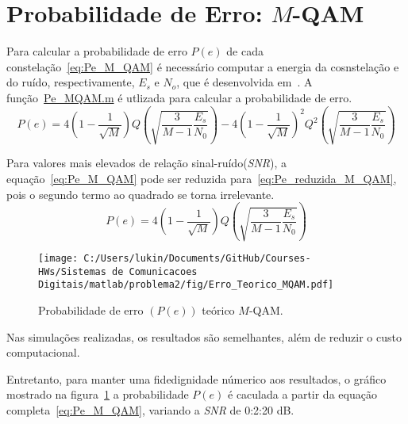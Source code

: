 \section{Probabilidade de Erro: \texorpdfstring{$M$}{M}-QAM}
Para calcular a probabilidade de erro $P(e)$ de cada constelação~\ref{eq:Pe_M_QAM} é necessário computar a energia da cosnstelação e do ruído, respectivamente, $E_s$ e $N_o$, que é desenvolvida em~\cite{Cecilio}. A função~\href{https://raw.githubusercontent.com/lucasabdalah/Courses-HWs/SCD/Sistemas%20de%20Comunicacoes%20Digitais/matlab/problema2/Pe_MQAM.m}{\colorbox{gray!10}{\color{red}Pe\_MQAM.m}} é utlizada para calcular a probabilidade de erro.
\begin{equation}
    P(e) = 4 \left(1-\frac{1}{\sqrt{M}}\right) Q\left(\sqrt{\frac{3}{M-1}\frac{E_s}{N_0}}\right) - 4\left(1-\frac{1}{\sqrt{M}}\right)^2 Q^2\left(\sqrt{\frac{3}{M-1}\frac{E_s}{N_0}}\right)
    \label{eq:Pe_M_QAM}
\end{equation}

Para valores mais elevados de relação sinal-ruído(\textit{SNR}), a equação~\ref{eq:Pe_M_QAM} pode ser reduzida para~\ref{eq:Pe_reduzida_M_QAM}, pois o segundo termo ao quadrado se torna irrelevante.
\begin{equation}
    P(e) = 4 \left(1-\frac{1}{\sqrt{M}}\right) Q\left(\sqrt{\frac{3}{M-1}\frac{E_s}{N_0}}\right)
    \label{eq:Pe_reduzida_M_QAM}
\end{equation}

\begin{figure}[!ht]
    \centering
    \texttt{[image: C:/Users/lukin/Documents/GitHub/Courses-HWs/Sistemas de Comunicacoes Digitais/matlab/problema2/fig/Erro\_Teorico\_MQAM.pdf]}
    \caption{Probabilidade de erro $(P(e))$ teórico $M$-QAM.}
    \label{fig:Erro_Teorico_MQAM}
\end{figure}

Nas simulações realizadas, os resultados são semelhantes, além de reduzir o custo computacional.

Entretanto, para manter uma fidedignidade númerico aos resultados, o gráfico mostrado na figura~\ref{fig:Erro_Teorico_MQAM} a probabilidade $P(e)$ é caculada a partir da equação completa~\ref{eq:Pe_M_QAM}, variando a \textit{SNR} de 0:2:20 dB.
